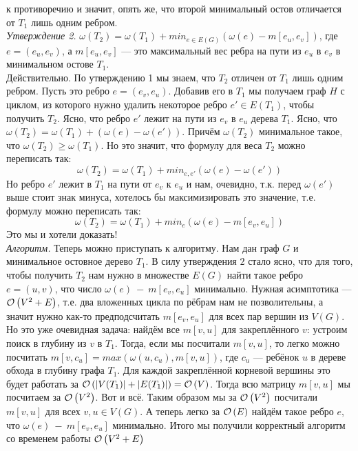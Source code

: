 к противоречию и значит, опять же, что второй минимальный остов отличается от $T_1$ лишь одним ребром. \xqed\\
\textit{Утверждение 2.} \underline{$\omega(T_2) = \omega(T_1) + min_{e\in E(G)}(\omega(e) - m[e_u,e_v])$}, где $e = (e_u,e_v)$, 
а $m[e_u,e_v]$ --- это максимальный вес ребра на пути из $e_u$ в $e_v$ в минимальном остове $T_1$.\\
Действительно. По утверждению 1 мы знаем, что $T_2$ отличен от $T_1$ лишь одним ребром. Пусть это ребро $e = (e_v, e_u)$. Добавив его
в $T_1$ мы получаем граф $H$ с циклом, из которого нужно удалить некоторое ребро $e' \in E(T_1)$, чтобы получить $T_2$. Ясно, что
ребро $e'$ лежит на пути из $e_v$ в $e_u$ дерева $T_1$. Ясно, что $\omega(T_2)=\omega(T_1)+(\omega(e)-\omega(e'))$. Причём
$\omega(T_2)$ минимальное такое, что $\omega(T_2) \geq \omega(T_1)$. Но это значит, что формулу для веса $T_2$ можно переписать
так:
\[ \omega(T_2) = \omega(T_1) + min_{e,e'}(\omega(e)-\omega(e'))\]
Но ребро $e'$ лежит в $T_1$ на пути от $e_v$ к $e_u$ и нам, очевидно, т.к. перед $\omega(e')$ выше стоит знак минуса,
хотелось бы максимизировать это значение, т.е. формулу можно переписать так:
\[ \omega(T_2) = \omega(T_1) + min_{e}(\omega(e)-m[e_v,e_u])\]
Это мы и хотели доказать! \xqed\\
\textit{Алгоритм.} Теперь можно приступать к алгоритму. Нам дан граф $G$ и минимальное остовное дерево $T_1$.
В силу утверждения $2$ стало ясно, что для того, чтобы получить $T_2$ нам нужно в множестве $E(G)$ найти такое ребро 
$e = (u, v)$, что число $\omega(e)~-~m[e_v,e_u]$ минимально. Нужная асимптотика --- $\mathcal{O}\left(V^2 + E\right)$, т.е. два вложенных
цикла по рёбрам нам не позволительны, а значит нужно как-то предподсчитать $m[e_v,e_u]$ для всех пар вершин из $V(G)$.
Но это уже очевидная задача: найдём все $m[v,u]$ для закреплённого $v$: устроим поиск в глубину из $v$ в $T_1$. Тогда,
если мы посчитали $m[v,u]$, то легко можно посчитать $m[v,c_u] = max(\omega(u,c_u),m[v,u])$, 
где $c_u$ --- ребёнок $u$ в дереве обхода в глубину графа $T_1$. Для каждой закреплённой корневой вершины это будет работать
за $\mathcal{O}\left(|V(T_1)|+|E(T_1)|\right) = \mathcal{O}\left(V\right)$. Тогда всю матрицу $m[v,u]$ мы посчитаем за $\mathcal{O}\left(V^2\right)$. Вот и всё. Таким образом 
мы за $\mathcal{O}\left(V^2\right)$ посчитали $m[v,u]$ для всех $v,u\in V(G)$. А теперь легко за $\mathcal{O}\left(E\right)$ найдём такое ребро $e$, что
$\omega(e)~-~m[e_v,e_u]$ минимально. Итого мы получили корректный алгоритм со временем работы $\mathcal{O}\left(V^2+E\right)$ \xqed


